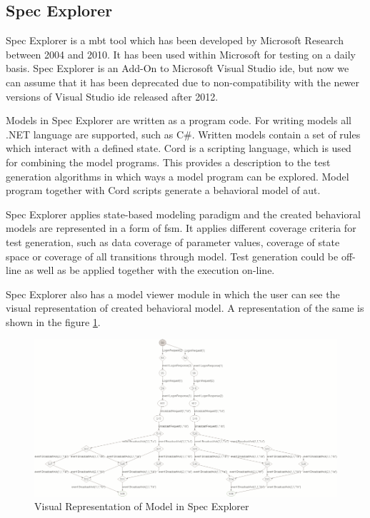 \subsection{Spec Explorer}
\par
Spec Explorer \cite{SpecExplorer_Description} is a \acrshort{mbt} tool which has been developed by Microsoft Research between 2004 and 2010. It has been used within Microsoft for testing on a daily basis. Spec Explorer is an Add-On to Microsoft Visual Studio \acrshort{ide}, but now we can assume that it has been deprecated due to non-compatibility with the newer versions of Visual Studio \acrshort{ide} released after 2012.
\par
Models in Spec Explorer are written as a program code. For writing models all .NET language are supported, such as C\#. Written models contain a set of rules which interact with a defined state. Cord is a scripting language, which is used for combining the model programs. This provides a description to the test generation algorithms in which ways a model program can be explored. Model program together with Cord scripts generate a behavioral model of \acrlong{aut}.

\par
Spec Explorer applies state-based modeling paradigm and the created behavioral models are represented in a form of \acrshort{fsm}. It applies different coverage criteria for test generation, such as data coverage of parameter values, coverage of state space or coverage of all transitions through model. Test generation could be off-line as well as be applied together with the execution on-line.

\par
Spec Explorer also has a model viewer module in which the user can see the visual representation of created behavioral model. A representation of the same is shown in the figure \ref{Fig:Model_View_In_SpecExplorer}.

\begin{figure} [htbp!]
	\centering
					\includegraphics[width=1\textwidth]{figures/Model_View_In_SpecExplorer.png}
					\caption{\label{Fig:Model_View_In_SpecExplorer} Visual Representation of Model in Spec Explorer \cite{SpecExplorer_ModelView}}
\end{figure}

